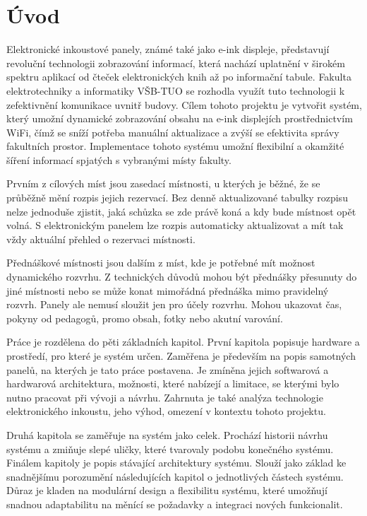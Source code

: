 \chapter{Úvod}

Elektronické inkoustové panely, známé také jako e-ink displeje, představují revoluční technologii zobrazování informací, která nachází uplatnění v širokém spektru aplikací od čteček elektronických knih až po informační tabule. Fakulta elektrotechniky a informatiky VŠB-TUO se rozhodla využít tuto technologii k zefektivnění komunikace uvnitř budovy. Cílem tohoto projektu je vytvořit systém, který umožní dynamické zobrazování obsahu na e-ink displejích prostřednictvím WiFi, čímž se sníží potřeba manuální aktualizace a zvýší se efektivita správy fakultních prostor. Implementace tohoto systému umožní flexibilní a okamžité šíření informací spjatých s vybranými místy fakulty.

Prvním z cílových míst jsou zasedací místnosti, u kterých je běžné, že se průběžně mění rozpis jejich rezervací. Bez denně aktualizované tabulky rozpisu nelze jednoduše zjistit, jaká schůzka se zde právě koná a kdy bude místnost opět volná. S elektronickým panelem lze rozpis automaticky aktualizovat a mít tak vždy aktuální přehled o rezervaci místnosti.

Přednáškové místnosti jsou dalším z míst, kde je potřebné mít možnost dynamického rozvrhu. Z technických důvodů mohou být přednášky přesunuty do jiné místnosti nebo se může konat mimořádná přednáška mimo pravidelný rozvrh. Panely ale nemusí sloužit jen pro účely rozvrhu. Mohou ukazovat čas, pokyny od pedagogů, promo obsah, fotky nebo akutní varování.

Práce je rozdělena do pěti základních kapitol. První kapitola popisuje hardware a prostředí, pro které je systém určen. Zaměřena je především na popis samotných panelů, na kterých je tato práce postavena. Je zmíněna jejich softwarová a hardwarová architektura, možnosti, které nabízejí a limitace, se kterými bylo nutno pracovat při vývoji a návrhu. Zahrnuta je také analýza technologie elektronického inkoustu, jeho výhod, omezení v kontextu tohoto projektu.

Druhá kapitola se zaměřuje na systém jako celek. Prochází historii návrhu systému a zmiňuje slepé uličky, které tvarovaly podobu konečného systému. Finálem kapitoly je popis stávající architektury systému. Slouží jako základ ke snadnějšímu porozumění následujících kapitol o jednotlivých částech systému. Důraz je kladen na modulární design a flexibilitu systému, které umožňují snadnou adaptabilitu na měnící se požadavky a integraci nových funkcionalit.

